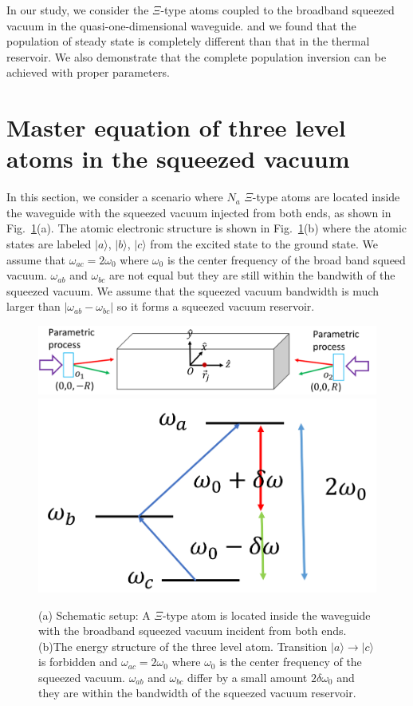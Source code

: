 \documentclass[aps,showpacs,twocolumn,twoside,groupedaddress]{revtex4}
\begin{document}
In our study, we consider the $\Xi$-type atoms coupled to the broadband squeezed vacuum in the quasi-one-dimensional waveguide. and we found that the population of steady state is completely different than that in the thermal reservoir. We also demonstrate that the complete population inversion can be achieved with proper parameters.

\section{Master equation of three level atoms in the squeezed vacuum}
In this section, we consider a scenario where $N_a$ $\Xi$-type atoms are located inside the waveguide with the squeezed vacuum injected from both ends, as shown in Fig.~\ref{1}(a). The atomic electronic structure is shown in Fig.~\ref{1}(b) where the atomic states are labeled $|a\rangle$, $|b\rangle$, $|c\rangle$ from the excited state to the ground state. We assume that $\omega_{ac}=2\omega_0$ where $\omega_0$ is the center frequency of the broad band squeed vacuum.  $\omega_{ab}$ and $\omega_{bc}$ are not equal but they are still within the bandwith of the squeezed vacuum. We assume that the squeezed vacuum bandwidth is much larger than $|\omega_{ab}-\omega_{bc}|$ so it forms a squeezed vacuum reservoir. 
\begin{figure}
\includegraphics[width=1.5\columnwidth]{fig1.png}
\includegraphics[width=0.5\columnwidth]{fig2.png}
\caption{(a) Schematic setup: A $\Xi$-type atom is located inside the waveguide with the broadband squeezed vacuum incident from both ends. (b)The energy structure of the three level atom. Transition $|a\rangle\rightarrow|c\rangle$ is forbidden and $\omega_{ac}=2\omega_0$ where $\omega_0$ is the center frequency of the squeezed vacuum. $\omega_{ab}$ and $\omega_{bc}$ differ by a small amount $2\delta\omega_0$ and they are within the bandwidth of the squeezed vacuum reservoir.}
\label{1}
\end{figure}
\end{document}
